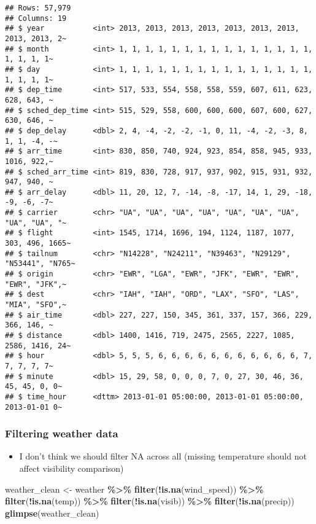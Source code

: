 \documentclass[
]{article}
\newenvironment{Shaded}{\begin{snugshade}}{\end{snugshade}}
\newcommand{\FunctionTok}[1]{\textcolor[rgb]{0.13,0.29,0.53}{\textbf{#1}}}
\newcommand{\NormalTok}[1]{#1}
\newcommand{\OtherTok}[1]{\textcolor[rgb]{0.56,0.35,0.01}{#1}}
\newcommand{\SpecialCharTok}[1]{\textcolor[rgb]{0.81,0.36,0.00}{\textbf{#1}}}
\providecommand{\tightlist}{%
  \setlength{\itemsep}{0pt}\setlength{\parskip}{0pt}}
\begin{document}
\begin{verbatim}
## Rows: 57,979
## Columns: 19
## $ year           <int> 2013, 2013, 2013, 2013, 2013, 2013, 2013, 2013, 2013, 2~
## $ month          <int> 1, 1, 1, 1, 1, 1, 1, 1, 1, 1, 1, 1, 1, 1, 1, 1, 1, 1, 1~
## $ day            <int> 1, 1, 1, 1, 1, 1, 1, 1, 1, 1, 1, 1, 1, 1, 1, 1, 1, 1, 1~
## $ dep_time       <int> 517, 533, 554, 558, 558, 559, 607, 611, 623, 628, 643, ~
## $ sched_dep_time <int> 515, 529, 558, 600, 600, 600, 607, 600, 627, 630, 646, ~
## $ dep_delay      <dbl> 2, 4, -4, -2, -2, -1, 0, 11, -4, -2, -3, 8, 1, 1, -4, -~
## $ arr_time       <int> 830, 850, 740, 924, 923, 854, 858, 945, 933, 1016, 922,~
## $ sched_arr_time <int> 819, 830, 728, 917, 937, 902, 915, 931, 932, 947, 940, ~
## $ arr_delay      <dbl> 11, 20, 12, 7, -14, -8, -17, 14, 1, 29, -18, -9, -6, -7~
## $ carrier        <chr> "UA", "UA", "UA", "UA", "UA", "UA", "UA", "UA", "UA", "~
## $ flight         <int> 1545, 1714, 1696, 194, 1124, 1187, 1077, 303, 496, 1665~
## $ tailnum        <chr> "N14228", "N24211", "N39463", "N29129", "N53441", "N765~
## $ origin         <chr> "EWR", "LGA", "EWR", "JFK", "EWR", "EWR", "EWR", "JFK",~
## $ dest           <chr> "IAH", "IAH", "ORD", "LAX", "SFO", "LAS", "MIA", "SFO",~
## $ air_time       <dbl> 227, 227, 150, 345, 361, 337, 157, 366, 229, 366, 146, ~
## $ distance       <dbl> 1400, 1416, 719, 2475, 2565, 2227, 1085, 2586, 1416, 24~
## $ hour           <dbl> 5, 5, 5, 6, 6, 6, 6, 6, 6, 6, 6, 6, 6, 6, 7, 7, 7, 7, 7~
## $ minute         <dbl> 15, 29, 58, 0, 0, 0, 7, 0, 27, 30, 46, 36, 45, 45, 0, 0~
## $ time_hour      <dttm> 2013-01-01 05:00:00, 2013-01-01 05:00:00, 2013-01-01 0~
\end{verbatim}

\subsubsection{Filtering weather data}\label{filtering-weather-data}

\begin{itemize}
\tightlist
\item
  I don't think we should filter NA across all (missing temperature
  should not affect visibility comparison)
\end{itemize}

\begin{Shaded}
\begin{Highlighting}[]
\NormalTok{weather\_clean }\OtherTok{\textless{}{-}}\NormalTok{ weather }\SpecialCharTok{\%\textgreater{}\%}
  \FunctionTok{filter}\NormalTok{(}\SpecialCharTok{!}\FunctionTok{is.na}\NormalTok{(wind\_speed)) }\SpecialCharTok{\%\textgreater{}\%}
  \FunctionTok{filter}\NormalTok{(}\SpecialCharTok{!}\FunctionTok{is.na}\NormalTok{(temp)) }\SpecialCharTok{\%\textgreater{}\%}
  \FunctionTok{filter}\NormalTok{(}\SpecialCharTok{!}\FunctionTok{is.na}\NormalTok{(visib)) }\SpecialCharTok{\%\textgreater{}\%}
  \FunctionTok{filter}\NormalTok{(}\SpecialCharTok{!}\FunctionTok{is.na}\NormalTok{(precip))}
\FunctionTok{glimpse}\NormalTok{(weather\_clean)}
\end{Highlighting}
\end{Shaded}
\end{document}
